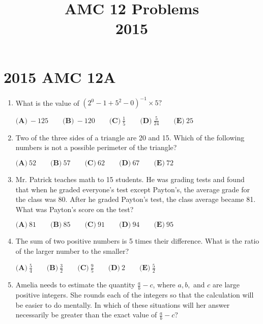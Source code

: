 \documentclass{article}
\title{AMC 12 Problems \\ 2015}
\date{}
\begin{document}
\maketitle\thispagestyle{fancy}\newpage\section*{2015 AMC 12A}
\begin{enumerate}[label=\arabic*., itemsep=0.5em]
\item What is the value of \((2^0-1+5^2-0)^{-1}\times5?\)

\( \textbf{(A)}\ -125\qquad\textbf{(B)}\ -120\qquad\textbf{(C)}\ \frac{1}{5}\qquad\textbf{(D)}\ \frac{5}{24}\qquad\textbf{(E)}\ 25 \)\par \vspace{0.5em}\item Two of the three sides of a triangle are 20 and 15. Which of the following numbers is not a possible perimeter of the triangle?

\( \textbf{(A)}\ 52\qquad\textbf{(B)}\ 57\qquad\textbf{(C)}\ 62\qquad\textbf{(D)}\ 67\qquad\textbf{(E)}\ 72 \)\par \vspace{0.5em}\item Mr. Patrick teaches math to 15 students. He was grading tests and found that when he graded everyone's test except Payton's, the average grade for the class was 80. After he graded Payton's test, the class average became 81. What was Payton's score on the test?

\( \textbf{(A)}\ 81\qquad\textbf{(B)}\ 85\qquad\textbf{(C)}\ 91\qquad\textbf{(D)}\ 94\qquad\textbf{(E)}\ 95 \)\par \vspace{0.5em}\item The sum of two positive numbers is 5 times their difference. What is the ratio of the larger number to the smaller?

\( \textbf{(A)}\ \frac54 \qquad\textbf{(B)}\ \frac32 \qquad\textbf{(C)}\ \frac95 \qquad\textbf{(D)}\ 2 \qquad\textbf{(E)}\ \frac52 \)\par \vspace{0.5em}\item Amelia needs to estimate the quantity \(\frac{a}{b} - c\), where \(a, b,\) and \(c\) are large positive integers. She rounds each of the integers so that the calculation will be easier to do mentally. In which of these situations will her answer necessarily be greater than the exact value of \(\frac{a}{b} - c\)?


\end{enumerate}
\end{document}
